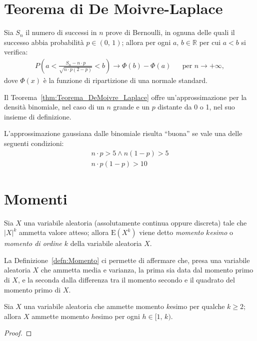     \section{Teorema di De Moivre-Laplace}
        \begin{thm}\label{thm:Teorema_DeMoivre_Laplace}
            Sia $S_n$ il numero di successi in $n$ prove di Bernoulli, in ognuna delle quali il successo abbia probabilità $p \in (0,\,1)$; allora per ogni $a,\,b \in \mathbb{R}$ per cui $a < b$ si verifica:
            \begin{align*}
                P\left(a < \frac{S_n - n\cdot p}{\sqrt{n\cdot p(2-p)}} < b\right) \rightarrow \Phi(b) - \Phi(a) & & \text{per }n \rightarrow +\infty
            ,\end{align*}
            dove $\Phi(x)$ è la funzione di ripartizione di una normale standard.
        \end{thm}
        \begin{obsv}
            Il Teorema~\ref{thm:Teorema_DeMoivre_Laplace} offre un'approssimazione per la densità binomiale, nel caso di un $n$ grande e un $p$ distante da 0 o 1, nel suo insieme di definizione.

            L'approssimazione gaussiana dalle binomiale risulta ``buona'' se vale una delle seguenti condizioni:
            \begin{gather*}
                n \cdot p > 5 \land n(1-p) > 5 \\
                n \cdot p (1 - p) > 10
            \end{gather*}
        \end{obsv}
    \section{Momenti}
        \begin{defn}\label{defn:Momento}
            Sia $X$ una variabile aleatoria (assolutamente continua oppure discreta) tale che $|X|^k$ ammetta valore atteso; allora $\text{E}(X^k)$ viene detto \textit{momento $k$\nbdash esimo} o \textit{momento di ordine $k$} della variabile aleatoria $X$.
        \end{defn}
        \begin{obsv}
            La Definizione~\ref{defn:Momento} ci permette di affermare che, presa una variabile aleatoria $X$ che ammetta media e varianza, la prima sia data dal momento primo di $X$, e la seconda dalla differenza tra il momento secondo e il quadrato del  momento primo di $X$.
        \end{obsv}
        \begin{prty}
            Sia $X$ una variabile aleatoria che ammette momento $k$\nbdash esimo per qualche $k \geq 2$; allora $X$ ammette momento $h$\nbdash esimo per ogni $h \in [1,\,k)$.
        \end{prty}
        \begin{proof}
            
        \end{proof}
